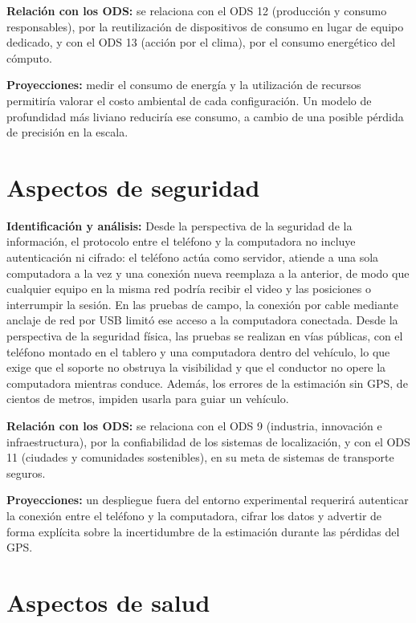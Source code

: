 \textbf{Relación con los ODS:}
se relaciona con el ODS 12 (producción y consumo responsables), por la reutilización de dispositivos de consumo en lugar de equipo dedicado, y con el ODS 13 (acción por el clima), por el consumo energético del cómputo.

\textbf{Proyecciones:}
medir el consumo de energía y la utilización de recursos permitiría valorar el costo ambiental de cada configuración.
Un modelo de profundidad más liviano reduciría ese consumo, a cambio de una posible pérdida de precisión en la escala.

\section{Aspectos de seguridad}

\textbf{Identificación y análisis:}
Desde la perspectiva de la seguridad de la información, el protocolo entre el teléfono y la computadora no incluye autenticación ni cifrado: el teléfono actúa como servidor, atiende a una sola computadora a la vez y una conexión nueva reemplaza a la anterior, de modo que cualquier equipo en la misma red podría recibir el video y las posiciones o interrumpir la sesión.
En las pruebas de campo, la conexión por cable mediante anclaje de red por USB limitó ese acceso a la computadora conectada.
Desde la perspectiva de la seguridad física, las pruebas se realizan en vías públicas, con el teléfono montado en el tablero y una computadora dentro del vehículo, lo que exige que el soporte no obstruya la visibilidad y que el conductor no opere la computadora mientras conduce.
Además, los errores de la estimación sin GPS, de cientos de metros, impiden usarla para guiar un vehículo.

\textbf{Relación con los ODS:}
se relaciona con el ODS 9 (industria, innovación e infraestructura), por la confiabilidad de los sistemas de localización, y con el ODS 11 (ciudades y comunidades sostenibles), en su meta de sistemas de transporte seguros.

\textbf{Proyecciones:}
un despliegue fuera del entorno experimental requerirá autenticar la conexión entre el teléfono y la computadora, cifrar los datos y advertir de forma explícita sobre la incertidumbre de la estimación durante las pérdidas del GPS.

\section{Aspectos de salud}

